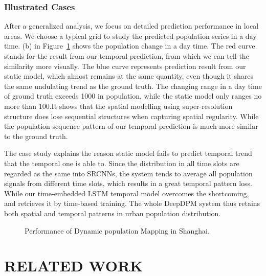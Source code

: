 \documentclass[letterpaper]{article} %
\begin{document}
\subsubsection{Illustrated Cases}
After a generalized analysis, we focus on detailed prediction performance in local areas. We choose a typical grid to study the predicted population series in a day time. (b) in Figure~\ref{fig:dynamic performance} shows the population change in a day time. The red curve stands for the result from our temporal prediction, from which we can tell the similarity more visually. The blue curve represents prediction result from our static model, which almost remains at the same quantity, even though it shares the same undulating trend as the ground truth. The changing range in a day time of ground truth exceeds 1000 in population, while the static model only ranges no more than 100.It shows that the spatial modelling using super-resolution structure does lose sequential structures when capturing spatial regularity. While the population sequence pattern of our temporal prediction is much more similar to the ground truth.

The case study explains the reason static model fails to predict temporal trend that the temporal one is able to. Since the distribution in all time slots are regarded as the same into SRCNNs, the system tends to average all population signals from different time slots, which results in a great temporal pattern loss. While our time-embedded LSTM temporal model overcomes the shortcoming, and retrieves it by time-based training. The whole DeepDPM system thus retains both spatial and temporal patterns in urban population distribution.

    
\begin{figure}[ht]
 \centering
 \caption{Performance of Dynamic population Mapping in Shanghai.}
 \label{fig:dynamic performance}
\end{figure}


\section{RELATED WORK} 
\label{sec:Relatedwork}
\end{document}
